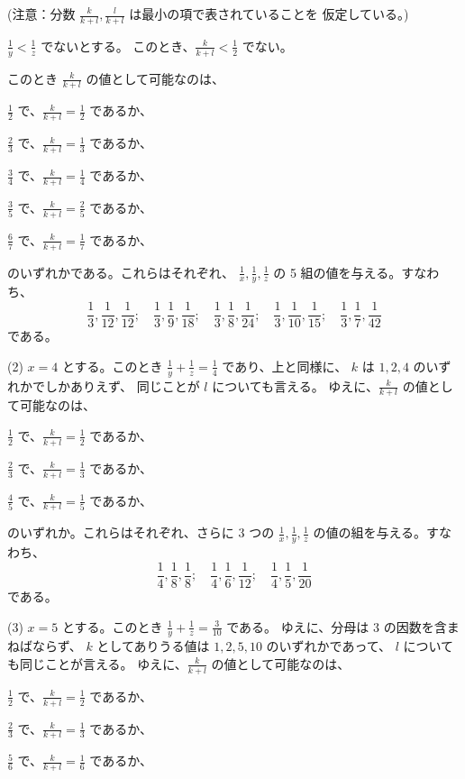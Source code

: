(注意：分数 $\frac{k}{k+l}, \frac{l}{k+l}$ は最小の項で表されていることを
仮定している。)

$\frac{1}{y} < \frac{1}{z}$ でないとする。
このとき、$\frac{k}{k+l} < \frac{1}{2}$ でない。

このとき $\frac{k}{k+l}$ の値として可能なのは、

$\frac{1}{2}$ で、$\frac{k}{k+l} = \frac{1}{2}$ であるか、

$\frac{2}{3}$ で、$\frac{k}{k+l} = \frac{1}{3}$ であるか、

$\frac{3}{4}$ で、$\frac{k}{k+l} = \frac{1}{4}$ であるか、

$\frac{3}{5}$ で、$\frac{k}{k+l} = \frac{2}{5}$ であるか、

$\frac{6}{7}$ で、$\frac{k}{k+l} = \frac{1}{7}$ であるか、

のいずれかである。これらはそれぞれ、
$\frac{1}{x},\frac{1}{y},\frac{1}{z}$
の 5 組の値を与える。すなわち、
\[
\frac{1}{3},\frac{1}{12},\frac{1}{12};
\quad
\frac{1}{3},\frac{1}{9},\frac{1}{18};
\quad
\frac{1}{3},\frac{1}{8},\frac{1}{24};
\quad
\frac{1}{3},\frac{1}{10},\frac{1}{15};
\quad
\frac{1}{3},\frac{1}{7},\frac{1}{42}
\]
である。

(2) $x = 4$ とする。このとき $\frac{1}{y} + \frac{1}{z} = \frac{1}{4}$
であり、上と同様に、
$k$ は $1, 2, 4$ のいずれかでしかありえず、
同じことが $l$ についても言える。
ゆえに、$\frac{k}{k+l}$ の値として可能なのは、

$\frac{1}{2}$ で、$\frac{k}{k+l} = \frac{1}{2}$ であるか、

$\frac{2}{3}$ で、$\frac{k}{k+l} = \frac{1}{3}$ であるか、

$\frac{4}{5}$ で、$\frac{k}{k+l} = \frac{1}{5}$ であるか、

のいずれか。これらはそれぞれ、さらに 3 つの
$\frac{1}{x},\frac{1}{y},\frac{1}{z}$
の値の組を与える。すなわち、
\[
\frac{1}{4},\frac{1}{8},\frac{1}{8};
\quad
\frac{1}{4},\frac{1}{6},\frac{1}{12};
\quad
\frac{1}{4},\frac{1}{5},\frac{1}{20}
\]
である。

(3) $x = 5$ とする。このとき $\frac{1}{y} + \frac{1}{z} = \frac{3}{10}$
である。
ゆえに、分母は $3$ の因数を含まねばならず、
$k$ としてありうる値は $1, 2, 5, 10$ のいずれかであって、
$l$ についても同じことが言える。
ゆえに、$\frac{k}{k+l}$ の値として可能なのは、

$\frac{1}{2}$ で、$\frac{k}{k+l} = \frac{1}{2}$ であるか、

$\frac{2}{3}$ で、$\frac{k}{k+l} = \frac{1}{3}$ であるか、

$\frac{5}{6}$ で、$\frac{k}{k+l} = \frac{1}{6}$ であるか、

